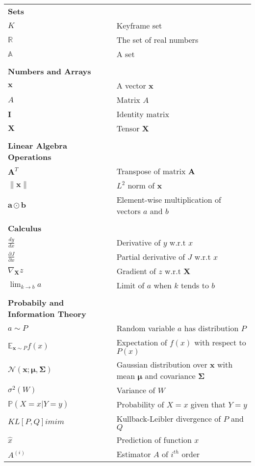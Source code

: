 \begin{longtable}{ll}
{\bf Sets} \\
$K$ & Keyframe set \\
$\mathbb{R}$ & The set of real numbers \\
$\mathbb{A}$ & A set \\
\\
{\bf Numbers and Arrays} \\
$\boldsymbol{x}$ & A vector $\boldsymbol{x}$ \\
$A$ & Matrix $A$ \\
$\boldsymbol{I}$ & Identity matrix \\
$\boldsymbol{X}$ & Tensor $\boldsymbol{X}$ \\
\\

{\bf Linear Algebra Operations} \\
$\boldsymbol{A}^{T}$ & Transpose of matrix $\boldsymbol{A}$ \\
$\lVert \boldsymbol{x} \rVert$ & $L^{2}$ norm of $\boldsymbol{x}$ \\
$\boldsymbol{a} \odot \boldsymbol{b}$ & Element-wise multiplication of vectors $a$ and $b$ \\

\\

{\bf Calculus} \\
$\frac{dy}{dx}$ & Derivative of $y$ w.r.t $x$ \\
$\frac{\partial{J}}{\partial{x}}$ & Partial derivative of $J$ w.r.t $x$ \\
$\nabla_{\boldsymbol{X}}z$ & Gradient of $z$ w.r.t $\boldsymbol{X}$ \\
$\lim_{k \rightarrow b} a$ & Limit of $a$ when $k$ tends to $b$ \\

\\

{\bf Probabily and Information Theory} \\
$a \sim P$ & Random variable $a$ has distribution $P$ \\
$\mathbb{E}_{\mathrm{\mathbf{x}}\sim P}f(x)$ & Expectation of $f(x)$ with respect to $P(x)$ \\
$\mathcal{N}(\boldsymbol{x}; \boldsymbol{\mu}, \boldsymbol{\Sigma})$ & Gaussian distribution over
$\boldsymbol{x}$ with mean $\boldsymbol{\mu}$ and covariance $\boldsymbol{\Sigma}$ \\
$\sigma^{2}(W)$ & Variance of $W$ \\
$\mathbb{P}(X = x| Y = y)$ & Probability of $X = x$ given that $Y = y$ \\
$KL[P,Q]imim$ & Kullback-Leibler divergence of $P$ and $Q$\\
$\hat{x}$ & Prediction of function $x$ \\
$A^{(i)}$ & Estimator $A$ of $i^{th}$ order \\



\end{longtable}
